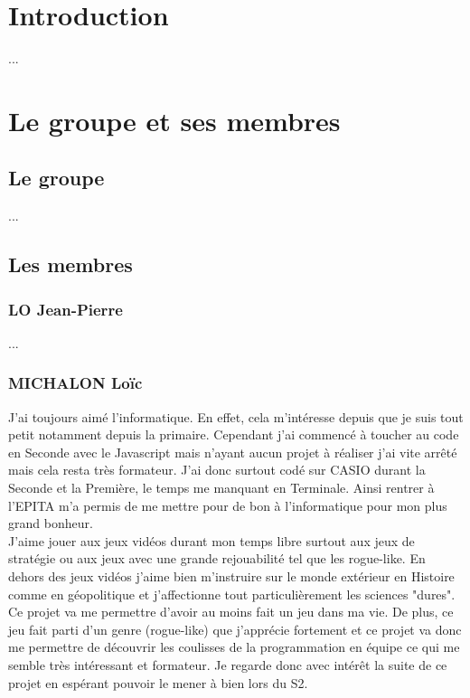 \documentclass{article}
\title{
    \textbf{ \begin{center} \Huge Cahier des charges \end{center} }
    \textrm{ \underline{Groupe:} Sépanou }
}
\author{
    LO Jean-Pierre | MICHALON Loïc \and
    MICHOT Maxence | TCHEKACHEV David
}
\date{Janvier 2021}
\begin{document}
\maketitle

\pagebreak

\renewcommand*\contentsname{\textbf{\Huge Sommaire \newline}}
\large \tableofcontents

\pagebreak
\normalsize
\section{Introduction}

...

\pagebreak

\section{Le groupe et ses membres}

\subsection{Le groupe}

...

\subsection{Les membres}

\subsubsection{LO Jean-Pierre}

...

\subsubsection{MICHALON Loïc}

J'ai toujours aimé l'informatique. En effet, cela m'intéresse depuis que je suis tout petit notamment depuis la primaire. Cependant j'ai commencé à toucher au code en Seconde avec le Javascript mais n'ayant aucun projet à réaliser j'ai vite arrêté mais cela resta très formateur. J'ai donc surtout codé sur CASIO durant la Seconde et la Première, le temps me manquant en Terminale. Ainsi rentrer à l'EPITA m'a permis de me mettre pour de bon à l'informatique pour mon plus grand bonheur.\\
J'aime jouer aux jeux vidéos durant mon temps libre surtout aux jeux de stratégie ou aux jeux avec une grande rejouabilité tel que les rogue-like. En dehors des jeux vidéos j'aime bien m'instruire sur le monde extérieur en Histoire comme en géopolitique et j'affectionne tout particulièrement les sciences "dures".\\
Ce projet va me permettre d'avoir au moins fait un jeu dans ma vie. De plus, ce jeu fait parti d'un genre (rogue-like) que j'apprécie fortement et ce projet va donc me permettre de découvrir les coulisses de la programmation en équipe ce qui me semble très intéressant et formateur. Je regarde donc avec intérêt la suite de ce projet en espérant pouvoir le mener à bien lors du S2.
\end{document}
